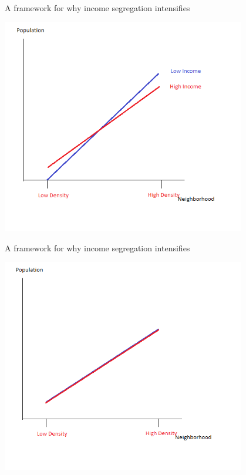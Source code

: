 \documentclass{beamer}
\begin{document}
\begin{frame}{A framework for why income segregation intensifies}\label{intuition}

	\includegraphics[width = 0.8\textwidth]{RegulatedEx.png}
	
\end{frame}

\begin{frame}{A framework for why income segregation intensifies}
	
	\includegraphics[width = 0.8\textwidth]{NoSorting.png}
	
	\hyperlink{returnWelfare}{} 
\end{frame}
\end{document}
